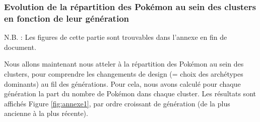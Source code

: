 \documentclass[a4paper,12pt]{article}
\begin{document}
\subsubsection{Evolution de la répartition des Pokémon au sein des clusters en fonction de leur génération}

N.B. : Les figures de cette partie sont trouvables dans l'annexe en fin de
document.

Nous allons maintenant nous atteler à la répartition des Pokémon au sein des
clusters, pour comprendre les changements de design (= choix des archétypes
dominants) au fil des générations. Pour cela, nous avons calculé pour chaque
génération la part du nombre de Pokémon dans chaque cluster. Les résultats sont
affichés Figure \ref{fig:annexe1}, par ordre croissant de génération (de la plus
ancienne à la plus récente).
\end{document}
